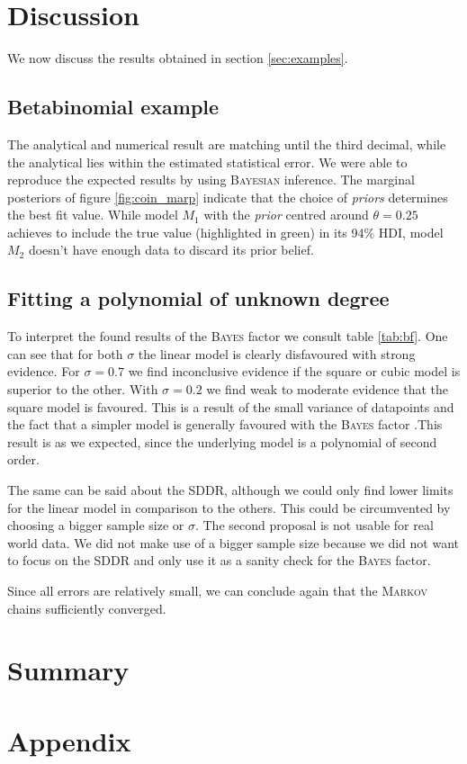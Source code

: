 \documentclass[%
 reprint,
 amsmath,amssymb,
 aps,
]{revtex4-1}
\begin{document}
\section{Discussion}
\noindent We now discuss the results obtained in section \eqref{sec:examples}.
\subsection{Betabinomial example}
\noindent The analytical and numerical result are matching until the third decimal, while the analytical lies within the estimated statistical error. We were able to reproduce the expected results by using \textsc{Bayesian} inference. The marginal posteriors of figure \eqref{fig:coin_marp} indicate that the choice of \emph{priors} determines the best fit value. While model $M_1$ with the \emph{prior} centred around  $\theta=0.25$ achieves to include the true value (highlighted in green) in its 94\% HDI, model $M_2$ doesn't have enough data to discard its prior belief. 
\subsection{Fitting a polynomial of unknown degree}
\noindent To interpret the found results of the \textsc{Bayes} factor we consult table \eqref{tab:bf}. One can see that for both $\sigma$ the linear model is clearly disfavoured with strong evidence. For $\sigma=0.7$ we find inconclusive evidence if the square or cubic model is superior to the other. With $\sigma=0.2$ we find weak to moderate evidence that the square model is favoured. This is a result of the small variance of datapoints and the fact that a simpler model is generally favoured with the \textsc{Bayes} factor \cite{sivia}.This result is as we expected, since the underlying model is a polynomial of second order. 

The same can be said about the SDDR, although we could only find lower limits for the linear model in comparison to the others. This could be circumvented by choosing a bigger sample size or $\sigma$. The second proposal is not usable for real world data. We did not make use of a bigger sample size because we did not want to focus on the SDDR and only use it as a sanity check for the \textsc{Bayes} factor. 

Since all errors are relatively small, we can conclude again that the \textsc{Markov} chains sufficiently converged.
\section{Summary}
\section{Appendix}\label{sec:Appendix}
\noindent 
\newpage


\end{document}
